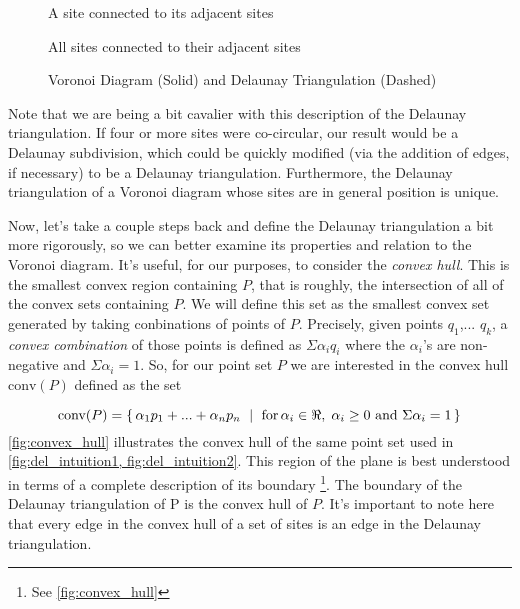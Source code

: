 \documentclass[12pt,twoside]{reedthesis}
\begin{document}
  \begin{figure}[!htb]
    \centering
    \begin{subtable}{.475\textwidth}
      
      \caption{A site connected to its adjacent sites}
      \label{fig:del_intuition1}
    \end{subtable}%
    \begin{subtable}{.475\textwidth}
      
      \caption{All sites connected to their adjacent sites}
      \label{fig:del_intuition2}
    \end{subtable}
    \caption{Voronoi Diagram (Solid) and Delaunay Triangulation (Dashed)}
    \label{fig:del_intuition}
  \end{figure}

  Note that we are being a bit cavalier with this description of the Delaunay triangulation. If four or more sites were co-circular, our result would be a Delaunay subdivision, which could be quickly modified (via the addition of edges, if necessary) to be a Delaunay triangulation. Furthermore, the Delaunay triangulation of a  Voronoi diagram whose sites are in general position is unique.\par

  Now, let's take a couple steps back and define the Delaunay triangulation a bit more rigorously, so we can better examine its properties and relation to the Voronoi diagram. It's useful, for our purposes, to consider the \emph{convex hull}.  This is the smallest convex region containing $P$, that is roughly, the intersection of all of the convex sets containing $P$. We will define this set as the smallest convex set generated by taking conbinations of points of $P$. Precisely, given points $q_{1}$,... $q_{k}$, a \emph{convex combination} of those points is defined as $\Sigma\alpha_{i}q_{i}$ where the $\alpha_{i}$'s are non-negative and $\Sigma\alpha_{i}=1.$  So, for our point set $P$ we are interested in the convex hull  $\mbox{conv}(P)$ defined as the set


  \[
   \mbox{conv}(P) = \{\, \alpha_{1}p_{1} + ... + \alpha_{n}p_{n} \ \mid\ \text{for$ \,\alpha_{i} \in \Re, \; \alpha_{i} \geq 0$ and $\Sigma\alpha_{i} = 1$}\,\} 
  \]
  \cref{fig:convex_hull} illustrates the convex hull of the same point set used in \cref{fig:del_intuition1, fig:del_intuition2}. 
  This region of the plane is best understood in terms of a complete description of its boundary \footnote{See \cref{fig:convex_hull}}. 
  The boundary of the Delaunay triangulation of P is the convex hull of $P$. It's important to note here that every edge in the convex hull of a set of sites is an edge in the Delaunay triangulation.
\end{document}

